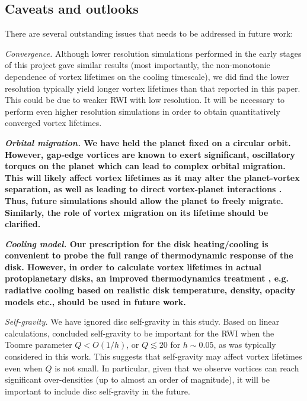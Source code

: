 
\subsection{Caveats and outlooks}
There are several outstanding issues that needs to be addressed
in future work: 

\emph{Convergence.} Although lower resolution simulations performed in
the early stages of this project gave similar results  
(most importantly, the non-monotonic dependence of vortex lifetimes on
the cooling timescale), we did find the lower resolution 
typically yield longer vortex lifetimes than that reported in this
paper. This could be due to weaker RWI with low resolution.  
It will be necessary to perform even higher resolution  simulations
in order to obtain quantitatively converged vortex lifetimes.  

{\bf
  \emph{Orbital migration.} We have held the planet fixed on a circular
  orbit. However, gap-edge vortices are known to exert
  significant, oscillatory torques on the planet \citep{li09}
  which can lead to complex orbital migration. This will likely affect
  vortex lifetimes as it may alter the planet-vortex separation, as
  well as leading to direct vortex-planet interactions
  \citep{lin10,ataiee14}. Thus, 
  future simulations should allow the planet to freely
  migrate. Similarly, the role of vortex migration on its lifetime
  should be clarified. 
}

{\bf 
  \emph{Cooling model.} Our prescription for the disk 
  heating/cooling is convenient to probe the full range of
  thermodynamic response of the disk. However, in order to calculate 
  vortex lifetimes in actual 
  protoplanetary disks, an improved thermodynamics treatment ,
  e.g. radiative cooling based on realistic disk temperature, density,
  opacity models etc., should be used in future work.   
}

\emph{Self-gravity.} We have ignored disc self-gravity in this
study. Based on linear calculations, \cite{lovelace13} concluded
self-gravity to be important for the RWI when the Toomre parameter $Q<O(1/h)$, or
$Q\lesssim 20$ for $h\sim0.05$, as was typically considered in this
work. This suggests that self-gravity may affect vortex lifetimes even
when $Q$ is not small. In particular, given that
we observe vortices can reach significant over-densities (up to almost
an order of magnitude), it will be important to include disc
self-gravity in the future. %
 
